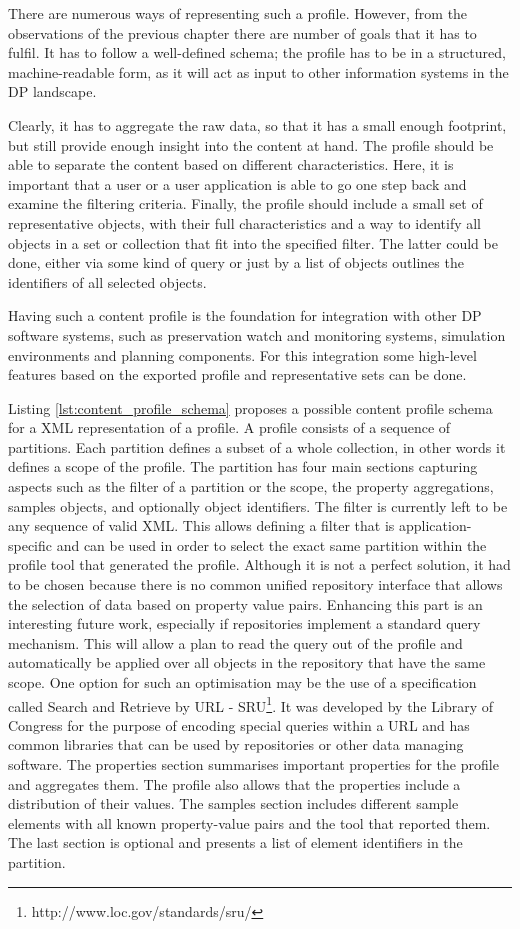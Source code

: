 There are numerous ways of representing such a profile. However, from the observations of the previous chapter there are number of goals that it has to fulfil. It has to follow a well-defined schema; the profile has to be in a structured, machine-readable form, as it will act as input to other information systems in the DP landscape.

Clearly, it has to aggregate the raw data, so that it has a small enough footprint, but still provide enough insight into the content at hand. The profile should be able to separate the content based on different characteristics. Here, it is important that a user or a user application is able to go one step back and examine the filtering criteria. Finally, the profile should include a small set of representative objects, with their full characteristics and a way to identify all objects in a set or collection that fit into the specified filter. The latter could be done, either via some kind of query or just by a list of objects outlines the identifiers of all selected objects.

Having such a content profile is the foundation for integration with other DP software systems, such as preservation watch and monitoring systems, simulation environments and planning components. For this integration some high-level features based on the exported profile and representative sets can be done.

Listing \ref{lst:content_profile_schema} proposes a possible content profile schema for a XML representation of a profile. A profile consists of a sequence of partitions. Each partition defines a subset of a whole collection, in other words it defines a scope of the profile. The partition has four main sections capturing aspects such as the filter of a partition or the scope, the property aggregations, samples objects, and optionally object identifiers. The filter is currently left to be any sequence of valid XML. This allows defining a filter that is application-specific and can be used in order to select the exact same partition within the profile tool that generated the profile. Although it is not a perfect solution, it had to be chosen because there is no common unified repository interface that allows the selection of data based on property value pairs. Enhancing this part is an interesting future work, especially if repositories implement a standard query mechanism. This will allow a plan to read the query out of the profile and automatically be applied over all objects in the repository that have the same scope. One option for such an optimisation may be the use of a specification called Search and Retrieve by URL - SRU\footnote{http://www.loc.gov/standards/sru/}. It was developed by the Library of Congress for the purpose of encoding special queries within a URL and has common libraries that can be used by repositories or other data managing software.
The properties section summarises important properties for the profile and aggregates them. The profile also allows that the properties include a distribution of their values.
The samples section includes different sample elements with all known property-value pairs and the tool that reported them.
The last section is optional and presents a list of element identifiers in the partition.

